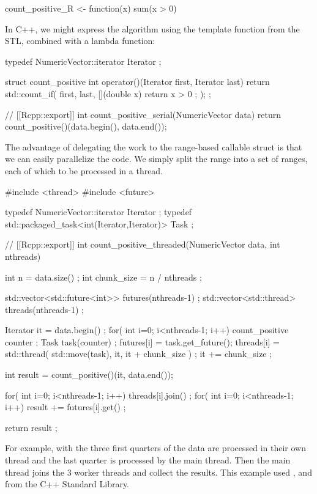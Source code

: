 \begin{example}
count_positive_R <- function(x){
  sum(x > 0)
}
\end{example}

In C++, we might express the algorithm using the  template
function from the STL, combined with a lambda function:

\begin{example}
typedef NumericVector::iterator Iterator ;

struct count_positive {
  int operator()(Iterator first, Iterator last){
    return std::count_if( first, last, 
      [](double x){ return x > 0 ; } 
    );    
  }
} ;

// [[Rcpp::export]]
int count_positive_serial(NumericVector data){
  return count_positive()(data.begin(), data.end());
}
\end{example}

The advantage of delegating the work to the range-based callable 
 struct is that we can easily 
parallelize the code. We simply split the range into a set of ranges, 
each of which to be processed in a thread. 

\begin{example}
#include <thread>
#include <future>

typedef NumericVector::iterator Iterator ;
typedef std::packaged_task<int(Iterator,Iterator)> Task ;

// [[Rcpp::export]]
int count_positive_threaded(NumericVector data, int nthreads){
  int n = data.size() ;
  int chunk_size = n / nthreads ; 
  
  std::vector<std::future<int>> futures(nthreads-1) ;
  std::vector<std::thread> threads(nthreads-1) ;
  
  Iterator it = data.begin() ;
  for( int i=0; i<nthreads-1; i++){
    count_positive counter ;        
    Task task(counter) ;
    futures[i] = task.get_future();
    threads[i] = std::thread( std::move(task), it, it + chunk_size ) ;
    it += chunk_size ;
  }
  
  int result = count_positive()(it, data.end()); 
  
  for( int i=0; i<nthreads-1; i++){
    threads[i].join() ;
  }
  for( int i=0; i<nthreads-1; i++){
    result += futures[i].get() ;  
  }
                            
  return result ;
}
\end{example}

For example, with  the three first quarters of the data
are processed in their own thread and the last quarter is processed by the 
main thread. Then the main thread joins the 3 worker threads and collect
the results. This example used ,  and
 from the C++ Standard Library. 


